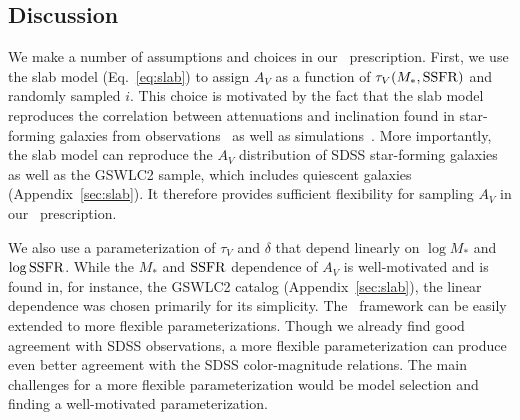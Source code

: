 \subsection{Discussion}  
We make a number of assumptions and choices in our \eda~prescription. 
First, we use the slab model (Eq.~\ref{eq:slab}) to assign $A_V$ as a
function of $\tau_V(M_*, {\rm SSFR})$ and randomly sampled $i$. 
This choice is motivated by the fact that the slab model reproduces
the correlation between attenuations and inclination found in star-forming
galaxies from observations~\citep{conroy2010b, wild2011, battisti2017,
salim2020} as well as simulations~\citep[\eg][]{chevallard2013,
narayanan2018, trayford2020}.
More importantly, the slab model can reproduce the $A_V$ distribution of
SDSS star-forming galaxies as well as the GSWLC2 sample, which includes
quiescent galaxies (Appendix~\ref{sec:slab}).
It therefore provides sufficient flexibility for sampling $A_V$ in our
\eda~prescription.

We also use a parameterization of $\tau_V$ and $\delta$ that
depend linearly on $\log M_*$ and $\log {\rm SSFR}$. 
While the $M_*$ and ${\rm SSFR}$ dependence of $A_V$ is well-motivated and is
found in, for instance, the \cite{salim2018} GSWLC2 catalog (Appendix~\ref{sec:slab}), 
the linear dependence was chosen primarily for its simplicity.
The \eda~framework can be easily extended to more flexible
parameterizations. 
Though we already find good agreement with SDSS observations, a more
flexible parameterization can produce
even better agreement with the SDSS color-magnitude relations. 
The main challenges for a more flexible parameterization would be model
selection and finding a well-motivated parameterization. 

